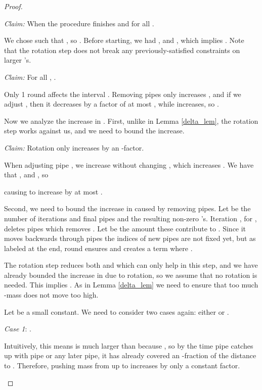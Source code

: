\documentclass[11pt]{article}
\begin{document}
\begin{proof}
\begin{description}
\item{\emph{Claim:}} When the procedure finishes  and  for all .

We chose  such that , so .  Before starting, we had , and , which implies .  Note that the rotation step does not break any previously-satisfied constraints on larger 's.

\item{\emph{Claim:}} For all , .

Only 1 round affects the interval .  Removing pipes only increases , and if we adjust , then it decreases by a factor of at most , while  increases, so .
\end{description}

Now we analyze the increase in .  
First, unlike in Lemma \ref{delta_lem}, the rotation step works against us, and we need to bound the increase.
\begin{description}
\item{\emph{Claim:}}
Rotation only increases  by an -factor.

When adjusting pipe , we increase  without changing , which increases .  We have that , and , so

causing  to increase by at most .
\end{description}

Second, we need to bound the increase in  caused by removing pipes.
Let  be the number of iterations and final pipes and  the resulting non-zero 's.  Iteration , for , deletes pipes  which removes .  
Let  be the amount these contribute to .
Since it moves backwards through pipes the indices of new pipes are not fixed yet, but as labeled at the end, round  ensures  and creates a term  where .
  
The rotation step reduces both  and  which can only help in this step,
and we have already bounded the increase in  due to rotation, so we assume that no rotation is needed.  
This implies .  
As in Lemma \ref{delta_lem} we need to ensure that too much -mass does not move too high.

Let  be a small constant.  We need to consider two cases again: either  or .

\begin{description}
\item{\emph{Case 1}:} .

Intuitively, this means  is much larger than  because , 
so by the time pipe  catches up with pipe  or any later pipe, it has already covered an -fraction of the distance to .  Therefore, pushing mass from up to  increases  by only a constant factor.


\end{description}
\end{proof}
\end{document}
